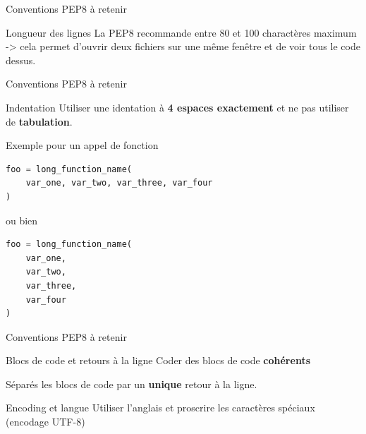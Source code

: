 \documentclass[10pt]{beamer}
\begin{document}
\begin{frame}[fragile]{Conventions PEP8 à retenir}
  \begin{block}{Longueur des lignes}
    \medskip
    La PEP8 recommande entre 80 et 100 charactères maximum -> cela permet d'ouvrir
    deux fichiers sur une même fenêtre et de voir tous le code dessus.
  \end{block}
\end{frame}


\begin{frame}[fragile]{Conventions PEP8 à retenir}
  \begin{block}{Indentation}
    \medskip
    Utiliser une identation à \textbf{4 espaces exactement} et ne pas utiliser de \textbf{tabulation}.
    
    Exemple pour un appel de fonction
\begin{lstlisting}[language=python, numbers=none, basicstyle=\ttfamily\scriptsize]
foo = long_function_name(
    var_one, var_two, var_three, var_four
)
\end{lstlisting}

ou bien

\begin{lstlisting}[language=python, numbers=none, basicstyle=\ttfamily\scriptsize]
foo = long_function_name(
    var_one,
    var_two,
    var_three,
    var_four
)
\end{lstlisting}
      
  \end{block}
\end{frame}



\begin{frame}[fragile]{Conventions PEP8 à retenir}
  \begin{block}{Blocs de code et retours à la ligne}
    \medskip
    Coder des blocs de code \textbf{cohérents}
    
    Séparés les blocs de code par un \textbf{unique} retour à la ligne.
  \end{block}

  \begin{block}{Encoding et langue}
    \medskip
    Utiliser l'anglais et proscrire les caractères spéciaux (encodage UTF-8)
  \end{block}
\end{frame}
\end{document}
